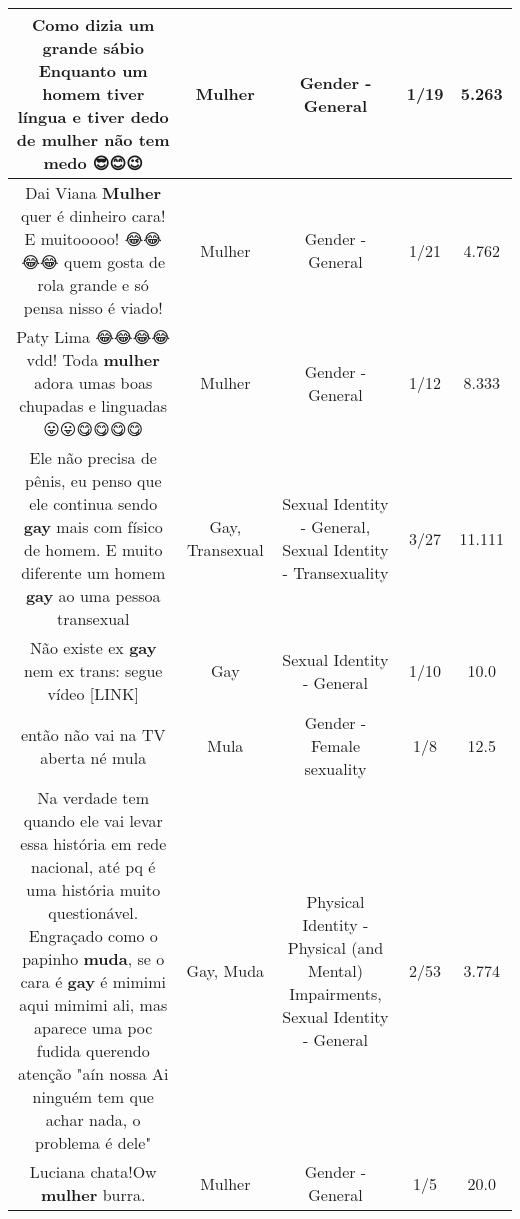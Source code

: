 \documentclass[11pt]{article}
\newlength\mylength
\begin{document}
\begin{center}
\begin{longtable}{|C{.65\mylength}|C{.30\mylength}|C{.12\mylength}|C{.12\mylength}|C{.12\mylength}|}
  \small Como dizia um grande sábio Enquanto um homem tiver língua e tiver dedo de \textbf{mulher} não tem medo 😎😊😉\normalsize   & Mulher & Gender - General & 1/19 & 5.263 \\  \hline
  \small Dai Viana \textbf{Mulher} quer é dinheiro cara! E muitooooo! 😂😂😂😂 quem gosta de rola grande e só pensa nisso é viado!\normalsize   & Mulher & Gender - General & 1/21 & 4.762 \\  \hline
  \small Paty Lima 😂😂😂😂 vdd! Toda \textbf{mulher} adora umas boas chupadas e linguadas😛😛😋😋😋😋\normalsize   & Mulher & Gender - General & 1/12 & 8.333 \\  \hline
  \small Ele não precisa de pênis, eu penso que ele continua sendo \textbf{gay} mais com físico de homem. E muito diferente um homem \textbf{gay} ao uma pessoa transexual\normalsize   & Gay, Transexual & Sexual Identity - General, Sexual Identity - Transexuality & 3/27 & 11.111 \\  \hline
  \small Não existe ex \textbf{gay} nem ex trans: segue vídeo  [LINK] \normalsize   & Gay & Sexual Identity - General & 1/10 & 10.0 \\  \hline
  \small então não vai na TV aberta né mula\normalsize   & Mula & Gender - Female sexuality & 1/8 & 12.5 \\  \hline
  \small Na verdade tem quando ele vai levar essa história em rede nacional, até pq é uma história muito questionável. Engraçado como o papinho \textbf{muda}, se o cara é \textbf{gay} é mimimi aqui mimimi ali, mas aparece uma poc fudida querendo atenção "aín nossa Ai ninguém tem que achar nada, o problema é dele"\normalsize   & Gay, Muda & Physical Identity - Physical (and Mental) Impairments, Sexual Identity - General & 2/53 & 3.774 \\  \hline
  \small Luciana chata!Ow \textbf{mulher} burra.\normalsize   & Mulher & Gender - General & 1/5 & 20.0 \\  \hline

\end{longtable}
\end{center}
\end{document}
